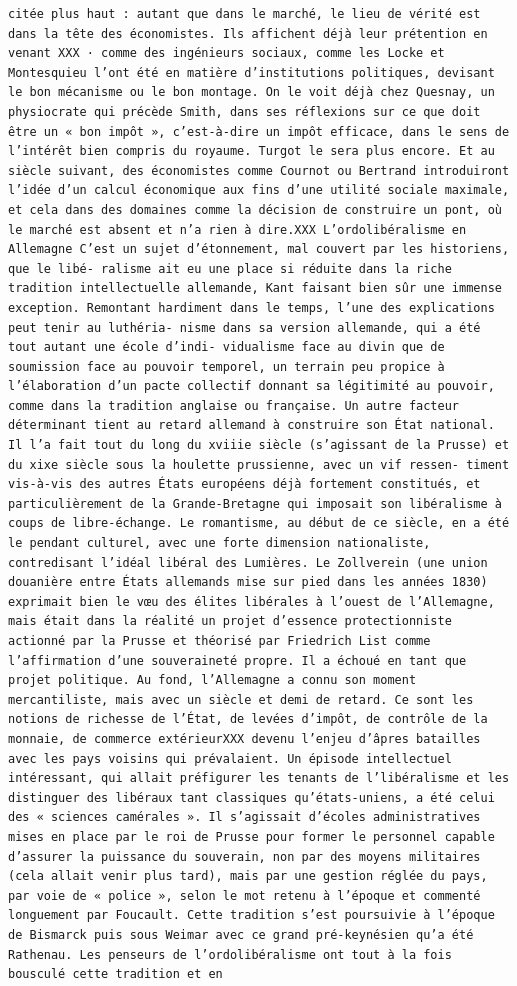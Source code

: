 \documentclass[
  letterpaper,
  DIV=11,
  numbers=noendperiod]{scrreprt}
\begin{document}
\begin{verbatim}
citée plus haut : autant que dans le marché, le lieu de vérité est dans la tête des économistes. Ils affichent déjà leur prétention en venant XXX · comme des ingénieurs sociaux, comme les Locke et Montesquieu l’ont été en matière d’institutions politiques, devisant le bon mécanisme ou le bon montage. On le voit déjà chez Quesnay, un physiocrate qui précède Smith, dans ses réflexions sur ce que doit être un « bon impôt », c’est‑à‑dire un impôt efficace, dans le sens de l’intérêt bien compris du royaume. Turgot le sera plus encore. Et au siècle suivant, des économistes comme Cournot ou Bertrand introduiront l’idée d’un calcul économique aux fins d’une utilité sociale maximale, et cela dans des domaines comme la décision de construire un pont, où le marché est absent et n’a rien à dire.XXX L’ordolibéralisme en Allemagne C’est un sujet d’étonnement, mal couvert par les historiens, que le libé‑ ralisme ait eu une place si réduite dans la riche tradition intellectuelle allemande, Kant faisant bien sûr une immense exception. Remontant hardiment dans le temps, l’une des explications peut tenir au luthéria‑ nisme dans sa version allemande, qui a été tout autant une école d’indi‑ vidualisme face au divin que de soumission face au pouvoir temporel, un terrain peu propice à l’élaboration d’un pacte collectif donnant sa légitimité au pouvoir, comme dans la tradition anglaise ou française. Un autre facteur déterminant tient au retard allemand à construire son État national. Il l’a fait tout du long du xviiie siècle (s’agissant de la Prusse) et du xixe siècle sous la houlette prussienne, avec un vif ressen‑ timent vis-à-vis des autres États européens déjà fortement constitués, et particulièrement de la Grande‑Bretagne qui imposait son libéralisme à coups de libre‑échange. Le romantisme, au début de ce siècle, en a été le pendant culturel, avec une forte dimension nationaliste, contredisant l’idéal libéral des Lumières. Le Zollverein (une union douanière entre États allemands mise sur pied dans les années 1830) exprimait bien le vœu des élites libérales à l’ouest de l’Allemagne, mais était dans la réalité un projet d’essence protectionniste actionné par la Prusse et théorisé par Friedrich List comme l’affirmation d’une souveraineté propre. Il a échoué en tant que projet politique. Au fond, l’Allemagne a connu son moment mercantiliste, mais avec un siècle et demi de retard. Ce sont les notions de richesse de l’État, de levées d’impôt, de contrôle de la monnaie, de commerce extérieurXXX devenu l’enjeu d’âpres batailles avec les pays voisins qui prévalaient. Un épisode intellectuel intéressant, qui allait préfigurer les tenants de l’libéralisme et les distinguer des libéraux tant classiques qu’états‑uniens, a été celui des « sciences camérales ». Il s’agissait d’écoles administratives mises en place par le roi de Prusse pour former le personnel capable d’assurer la puissance du souverain, non par des moyens militaires (cela allait venir plus tard), mais par une gestion réglée du pays, par voie de « police », selon le mot retenu à l’époque et commenté longuement par Foucault. Cette tradition s’est poursuivie à l’époque de Bismarck puis sous Weimar avec ce grand pré‑keynésien qu’a été Rathenau. Les penseurs de l’ordolibéralisme ont tout à la fois bousculé cette tradition et en 
\end{verbatim}
\end{document}
